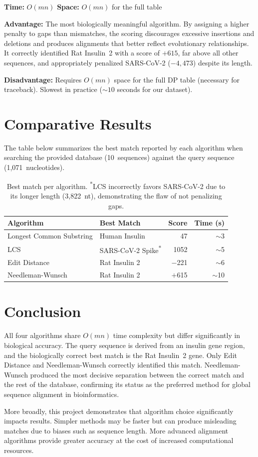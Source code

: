 \documentclass{article}
\begin{document}
\textbf{Time:} $O(mn)$ \quad \textbf{Space:} $O(mn)$ for the full table

\textbf{Advantage:} The most biologically meaningful algorithm. By assigning a higher penalty to gaps than mismatches, the scoring discourages excessive insertions and deletions and produces alignments that better reflect evolutionary relationships. It correctly identified Rat Insulin~2 with a score of $+615$, far above all other sequences, and appropriately penalized SARS-CoV-2 ($-4{,}473$) despite its length.

\textbf{Disadvantage:} Requires $O(mn)$ space for the full DP table (necessary for traceback). Slowest in practice (${\sim}10$ seconds for our dataset).

\section{Comparative Results}

The table below summarizes the best match reported by each algorithm when searching the provided database (10~sequences) against the query sequence (1,071~nucleotides).

\begin{table}[h]
\centering
\begin{tabular}{@{}llrr@{}}
\toprule
\textbf{Algorithm} & \textbf{Best Match} & \textbf{Score} & \textbf{Time (s)} \\
\midrule
Longest Common Substring & Human Insulin & 47 & $\sim$3 \\
LCS & SARS-CoV-2 Spike\textsuperscript{*} & 1052 & $\sim$5 \\
Edit Distance & Rat Insulin 2 & $-$221 & $\sim$6 \\
Needleman-Wunsch & Rat Insulin 2 & $+$615 & $\sim$10 \\
\bottomrule
\end{tabular}
\caption{Best match per algorithm. \textsuperscript{*}LCS incorrectly favors SARS-CoV-2 due to its longer length (3,822~nt), demonstrating the flaw of not penalizing gaps.}
\end{table}

\section{Conclusion}

All four algorithms share $O(mn)$ time complexity but differ significantly in biological accuracy. The query sequence is derived from an insulin gene region, and the biologically correct best match is the Rat Insulin~2 gene. Only Edit Distance and Needleman-Wunsch correctly identified this match. Needleman-Wunsch produced the most decisive separation between the correct match and the rest of the database, confirming its status as the preferred method for global sequence alignment in bioinformatics.

More broadly, this project demonstrates that algorithm choice significantly impacts results. Simpler methods may be faster but can produce misleading matches due to biases such as sequence length. More advanced alignment algorithms provide greater accuracy at the cost of increased computational resources.
\end{document}
